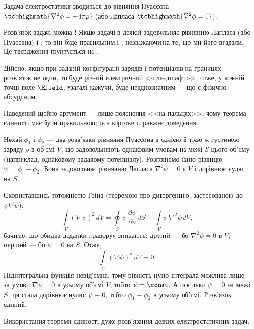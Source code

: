Задача електростатики зводиться до 
рівняння Пуассона $\tcbhighmath{\nabla^2\phi = - 4\pi\rho}$ (або Лапласа
$\tcbhighmath{\nabla^2\phi = 0}$).

Розв'язок задачі можна ! Якщо  задачі в деякій
 задовольняє рівнянню Лапласа (або Пуассона) і , то він буде правильним і , незважаючи на те, що ми його
вгадали. Це твердження ґрунтується на .

Дійсно, якщо при заданій конфігурації зарядів і потенціалів
на границях розв'язок не один, то буде різний електричний <<ландшафт>>, отже, у кожній
точці поле $\Efield$, узагалі кажучи, буде неоднозначним --- що є фізично абсурдним.

\begin{Attention}
    Наведений щойно аргумент --- лише пояснення <<на пальцях>>, чому теорема єдиності має бути правильною; ось коротке справжнє доведення.

    Нехай $\phi_1$ і $\phi_2$ --- два розв'язки рівняння Пуассона з однією й тією ж густиною заряду $\rho$ в об'ємі $V$, що задовольняють однаковим умовам на межі $S$ цього об'єму (наприклад, однаковому заданому потенціалу). Розглянемо їхню різницю $\psi = \phi_1 - \phi_2$. Вона задовольняє рівнянню Лапласа $\nabla^2\psi = 0$ в $V$ і дорівнює нулю на $S$.

    Скориставшись тотожністю Гріна (теоремою про дивергенцію, застосованою до $\psi\nabla\psi$):
    \begin{equation*}
        \int\limits_V (\nabla\psi)^2\, dV = \oint\limits_S \psi\,\frac{\partial\psi}{\partial n}\, dS - \int\limits_V \psi\, \nabla^2\psi\, dV,
    \end{equation*}
    бачимо, що обидва доданки праворуч зникають: другий --- бо $\nabla^2\psi = 0$ в $V$, перший --- бо $\psi = 0$ на $S$. Отже,
    \begin{equation*}
        \int\limits_V (\nabla\psi)^2\, dV = 0.
    \end{equation*}
    Підінтегральна функція невід'ємна, тому рівність нулю інтеграла можлива лише за умови $\nabla\psi = 0$ в усьому об'ємі $V$, тобто $\psi = \const$. А оскільки $\psi = 0$ на межі $S$, ця стала дорівнює нулю: $\psi \equiv 0$, тобто $\phi_1 \equiv \phi_2$ в усьому об'ємі. Розв'язок єдиний.
\end{Attention}

Використання теореми єдиності дуже  розв'язання деяких електростатичних
задач.




